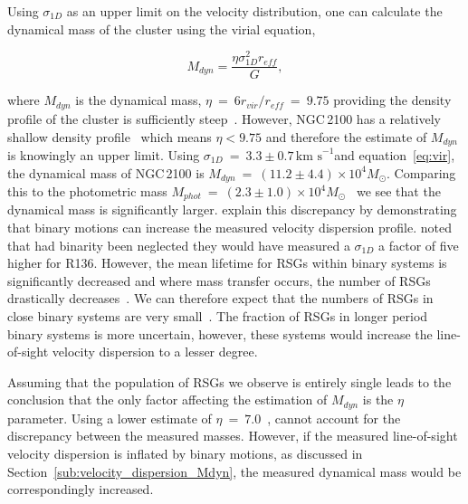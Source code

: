 \documentclass[useAMS,usenatbib]{mn2e}
\def\kms{$\mbox{km s}^{-1}$}
\begin{document}
Using $\sigma_{1D}$ as an upper limit on the velocity distribution, one can calculate the dynamical mass of the cluster using the virial equation,

\begin{equation}
  M_{dyn} = \frac{\eta\sigma_{1D}^{2}r_{eff}}{G},
  \label{eq:vir}
\end{equation}

\noindent where $M_{dyn}$ is the dynamical mass, $\eta~=~6r_{vir}/r_{eff}~=~9.75$ providing the density profile of the cluster is sufficiently steep~\citep{2010ARA&A..48..431P}.
However, NGC\,2100 has a relatively shallow density profile~\citep[$\gamma~=~2.44\pm0.14$;][]{2003MNRAS.338...85M} which means $\eta<9.75$ and therefore the estimate of $M_{dyn}$ is knowingly an upper limit.
Using $\sigma_{1D}~=~3.3\pm0.7$\,\kms and equation~\ref{eq:vir}, the dynamical mass of NGC\,2100 is $M_{dyn}~=~(11.2\pm4.4)\times 10^{4}M_{\odot}$.
Comparing this to the photometric mass $M_{phot}~=~(2.3\pm1.0)\times 10^{4}M_{\odot}$~\citep{2005ApJS..161..304M} we see that the dynamical mass is significantly larger.
\citet{2010MNRAS.402.1750G} explain this discrepancy by demonstrating that binary motions can increase the measured velocity dispersion profile.
\citet{2012A&A...546A..73H} noted that had binarity been neglected they would have measured a $\sigma_{1D}$ a factor of five higher for R136.
However, the mean lifetime for RSGs within binary systems is significantly decreased and where mass transfer occurs, the number of RSGs drastically decreases~\citep{2008MNRAS.384.1109E}.
We can therefore expect that the numbers of RSGs in close binary systems are very small~\citep{2009ApJ...696.2014D}.
The fraction of RSGs in longer period binary systems is more uncertain, however, these systems would increase the line-of-sight velocity dispersion to a lesser degree.

Assuming that the population of RSGs we observe is entirely single leads to the conclusion that the only factor affecting the estimation of $M_{dyn}$ is the $\eta$ parameter.
Using a lower estimate of $\eta~=~7.0$~\citep[estimated from Fig. 4a in][ giving $M_{dyn}~=~(8.0\pm3.1)\times 10^{4}M_{\odot}$]{2010ARA&A..48..431P}, cannot account for the discrepancy between the measured masses.
However, if the measured line-of-sight velocity dispersion is inflated by binary motions, as discussed in Section~\ref{sub:velocity_dispersion_Mdyn}, the measured dynamical mass would be correspondingly increased.
\end{document}
